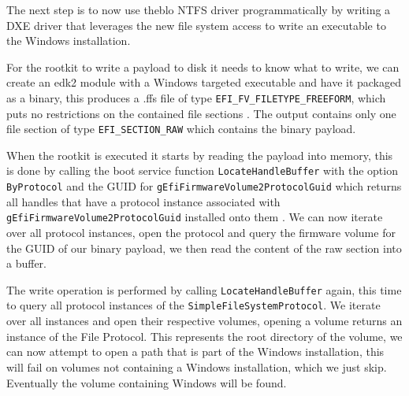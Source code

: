 
The next step is to now use theblo NTFS driver programmatically by writing a DXE driver that leverages the new file system access to write an executable to the Windows installation.


For the rootkit to write a payload to disk it needs to know what to write, we can create an edk2 module with a Windows targeted executable and have it packaged as a binary, this produces a .ffs file of type \lstinline{EFI_FV_FILETYPE_FREEFORM}, which puts no restrictions on the contained file sections \cite[Vol 3, 2.1.4.1.7]{pi-spec}. The output contains only one file section of type \lstinline{EFI_SECTION_RAW} which contains the binary payload.

When the rootkit is executed it starts by reading the payload into memory, this is done by calling the boot service function \lstinline{LocateHandleBuffer} with the option \lstinline{ByProtocol} and the GUID for \lstinline{gEfiFirmwareVolume2ProtocolGuid} which returns all handles that have a protocol instance associated with \lstinline{gEfiFirmwareVolume2ProtocolGuid} installed onto them \cite[7.3]{uefi-spec}. We can now iterate over all protocol instances, open the protocol and query the firmware volume for the GUID of our binary payload, we then read the content of the raw section into a buffer. 



The write operation is performed by calling \lstinline{LocateHandleBuffer} again, this time to query all protocol instances of the \lstinline{SimpleFileSystemProtocol}. We iterate over all instances and open their respective volumes, opening a volume returns an instance of the File Protocol. This represents the root directory of the volume, we can now attempt to open a path that is part of the Windows installation, this will fail on volumes not containing a Windows installation, which we just skip. Eventually the volume containing Windows will be found.

